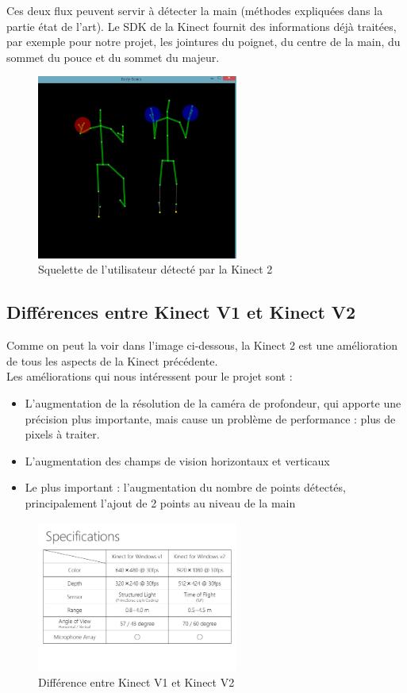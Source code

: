 Ces deux flux peuvent servir à détecter la main (méthodes expliquées dans la partie état de l'art).
Le SDK de la Kinect fournit des informations déjà traitées, 
par exemple pour notre projet, les jointures du poignet, du centre de la main, du sommet du pouce et du sommet du majeur.

\begin{figure}[H]
\center
\includegraphics[width=250px]{images/kinec2_skel.png}
\caption{Squelette de l'utilisateur détecté par la Kinect 2}
\label{fig:skeleton_kinect2}
\end{figure}

\subsection{Différences entre Kinect V1 et Kinect V2}

Comme on peut la voir dans l'image ci-dessous, la Kinect 2 est une amélioration de tous les aspects de la Kinect précédente.\\

Les améliorations qui nous intéressent pour le projet sont : 
\begin{itemize}
 \item L'augmentation de la résolution de la caméra de profondeur, qui apporte une précision plus importante, mais cause un problème de performance : plus de pixels à traiter.
 \item L'augmentation des champs de vision horizontaux et verticaux
 \item Le plus important : l'augmentation du nombre de points détectés, principalement l'ajout de 2 points au niveau de la main
\end{itemize}

\begin{figure}[H]
  \begin{center}
    \includegraphics[width=250px]{images/kinect-v2-introduction-and-tutorial-8-638.jpg}
    \caption{Différence entre Kinect V1 et Kinect V2}
    \label{fig:kinect1vs2}
  \end{center}
\end{figure}


